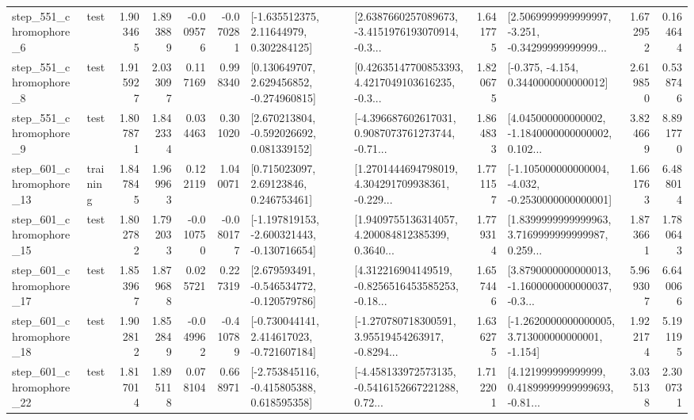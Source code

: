 \begin{tabular}{llrrrrllrlrr}
   step\_551\_chromophore\_6 &      test &      1.903465 &    1.893889 &     -0.009576 & -0.070281 &     [-1.635512375, 2.11644979, 0.302284125] &  [2.6387660257089673, -3.4151976193070914, -0.3... &       1.641775 &  [2.5069999999999997, -3.251, -0.34299999999999... &            1.672952 &          0.164644 \\
   step\_551\_chromophore\_8 &      test &      1.915927 &    2.033097 &      0.117169 &  0.998340 &    [0.130649707, 2.629456852, -0.274960815] &  [0.42635147700853393, 4.4217049103616235, -0.3... &       1.820675 &               [-0.375, -4.154, 0.3440000000000012] &            2.619850 &          0.538746 \\
   step\_551\_chromophore\_9 &      test &      1.807871 &    1.842334 &      0.034463 &  0.301020 &    [2.670213804, -0.592026692, 0.081339152] &  [-4.396687602617031, 0.9087073761273744, -0.71... &       1.864833 &  [4.045000000000002, -1.1840000000000002, 0.102... &            3.824669 &          8.891770 \\
  step\_601\_chromophore\_13 &  training &      1.847845 &    1.969963 &      0.122119 &  1.040071 &      [0.715023097, 2.69123846, 0.246753461] &  [1.2701444694798019, 4.304291709938361, -0.229... &       1.771157 &  [-1.105000000000004, -4.032, -0.2530000000000001] &            1.661763 &          6.488014 \\
  step\_601\_chromophore\_15 &      test &      1.802782 &    1.792033 &     -0.010750 & -0.080177 &  [-1.197819153, -2.600321443, -0.130716654] &  [1.9409755136314057, 4.200084812385399, 0.3640... &       1.779314 &  [1.8399999999999963, 3.7169999999999987, 0.259... &            1.873661 &          1.780643 \\
  step\_601\_chromophore\_17 &      test &      1.853967 &    1.879688 &      0.025721 &  0.227319 &   [2.679593491, -0.546534772, -0.120579786] &  [4.312216904149519, -0.8256516453585253, -0.18... &       1.657446 &  [3.8790000000000013, -1.1600000000000037, -0.3... &            5.969307 &          6.640066 \\
  step\_601\_chromophore\_18 &      test &      1.902812 &    1.852849 &     -0.049962 & -0.410789 &   [-0.730044141, 2.414617023, -0.721607184] &  [-1.270780718300591, 3.95519454263917, -0.8294... &       1.636275 &   [-1.2620000000000005, 3.713000000000001, -1.154] &            1.922174 &          5.191195 \\
  step\_601\_chromophore\_22 &      test &      1.817014 &    1.895118 &      0.078104 &  0.668971 &   [-2.753845116, -0.415805388, 0.618595358] &  [-4.458133972573135, -0.5416152667221288, 0.72... &       1.712201 &  [4.121999999999999, 0.41899999999999693, -0.81... &            3.035138 &          2.300731 \\

\end{tabular}
